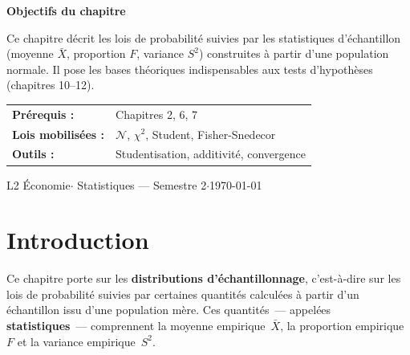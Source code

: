 \documentclass[11pt,a4paper]{article}
\newcommand{\N}{\mathcal{N}}
\begin{document}
\hspace*{2.2cm}%
\begin{minipage}[t]{0.85\textwidth}
  \begin{tcolorbox}[
    enhanced, colback=navylight, colframe=navydark,
    boxrule=0pt, leftrule=4pt, arc=2pt,
    top=10pt, bottom=10pt, left=12pt, right=12pt
  ]
  \sffamily\color{textprimary}
  \textbf{Objectifs du chapitre}

  \smallskip
  Ce chapitre d\'ecrit les lois de probabilit\'e suivies par les statistiques
  d'\'echantillon (moyenne $\bar{X}$, proportion $F$, variance $S^2$) construites
  \`a partir d'une population normale. Il pose les bases th\'eoriques indispensables
  aux tests d'hypoth\`eses (chapitres 10--12).

  \medskip
  \begin{tabular}{@{}ll@{}}
  \textbf{Pr\'erequis :} & Chapitres 2, 6, 7 \\
  \textbf{Lois mobilis\'ees :} & $\N$, $\chi^2$, Student, Fisher-Snedecor \\
  \textbf{Outils :} & Studentisation, additivit\'e, convergence \\
  \end{tabular}
  \end{tcolorbox}

  \vfill
  \textcolor{textsecondary}{\sffamily\small L2 \'Economie\quad$\cdot$\quad
    Statistiques --- Semestre 2\quad$\cdot$\quad \today}
\end{minipage}

\newpage

\thispagestyle{empty}
{\hypersetup{linkcolor=textprimary}
\tableofcontents}
\newpage

\section*{Introduction}

Ce chapitre porte sur les \textbf{distributions d'\'echantillonnage}, c'est-\`a-dire sur les lois de probabilit\'e suivies par certaines quantit\'es calcul\'ees \`a partir d'un \'echantillon issu d'une population m\`ere. Ces quantit\'es~--- appel\'ees \textbf{statistiques}~--- comprennent la moyenne empirique~$\bar{X}$, la proportion empirique~$F$ et la variance empirique~$S^2$.
\end{document}

